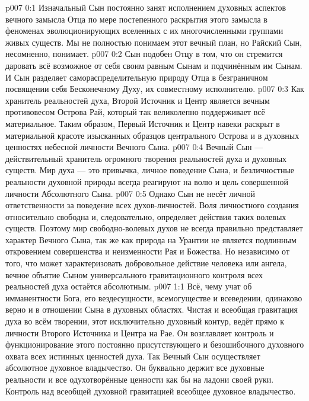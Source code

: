 \author{Божественный Советник}
\vs p007 0:1 Изначальный Сын постоянно занят исполнением духовных аспектов вечного замысла Отца по мере постепенного раскрытия этого замысла в феноменах эволюционирующих вселенных с их многочисленными группами живых существ. Мы не полностью понимаем этот вечный план, но Райский Сын, несомненно, понимает.
\vs p007 0:2 Сын подобен Отцу в том, что он стремится даровать всё возможное от себя своим равным Сынам и подчинённым им Сынам. И Сын разделяет самораспределительную природу Отца в безграничном посвящении себя Бесконечному Духу, их совместному исполнителю.
\vs p007 0:3 \pc Как хранитель реальностей духа, Второй Источник и Центр является вечным противовесом Острова Рай, который так великолепно поддерживает всё материальное. Таким образом, Первый Источник и Центр навеки раскрыт в материальной красоте изысканных образцов центрального Острова и в духовных ценностях небесной личности Вечного Сына.
\vs p007 0:4 \pc Вечный Сын --- действительный хранитель огромного творения реальностей духа и духовных существ. Мир духа --- это привычка, личное поведение Сына, и безличностные реальности духовной природы всегда реагируют на волю и цель совершенной личности Абсолютного Сына.
\vs p007 0:5 Однако Сын не несёт личной ответственности за поведение всех духов\hyp{}личностей. Воля личностного создания относительно свободна и, следовательно, определяет действия таких волевых существ. Поэтому мир свободно\hyp{}волевых духов не всегда правильно представляет характер Вечного Сына, так же как природа на Урантии не является подлинным откровением совершенства и неизменности Рая и Божества. Но независимо от того, что может характеризовать добровольное действие человека или ангела, вечное объятие Сыном универсального гравитационного контроля всех реальностей духа остаётся абсолютным.
\vs p007 1:1 Всё, чему учат об имманентности Бога, его вездесущности, всемогуществе и всеведении, одинаково верно и в отношении Сына в духовных областях. Чистая и всеобщая гравитация духа во всём творении, этот исключительно духовный контур, ведёт прямо к личности Второго Источника и Центра на Рае. Он возглавляет контроль и функционирование этого постоянно присутствующего и безошибочного духовного охвата всех истинных ценностей духа. Так Вечный Сын осуществляет абсолютное духовное владычество. Он буквально держит все духовные реальности и все одухотворённые ценности как бы на ладони своей руки. Контроль над всеобщей духовной гравитацией  всеобщее духовное владычество.
